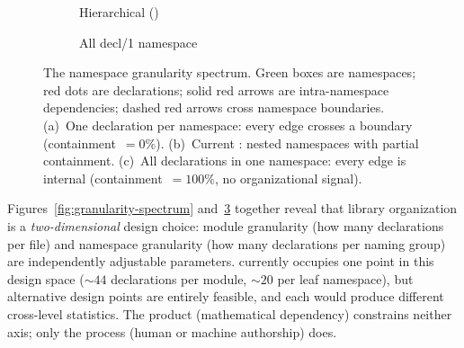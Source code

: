 \begin{figure}[ht]
\begin{subfigure}[b]{0.36\textwidth}
\caption{Hierarchical ()}
\label{fig:ns-gran-current}
\end{subfigure}%
\hfill
\begin{subfigure}[b]{0.30\textwidth}
\centering
{}
\caption{All decl/1 namespace}
\label{fig:ns-gran-single}
\end{subfigure}
\caption{The namespace granularity spectrum. \textcolor{green!50!black}{Green boxes} are namespaces; \textcolor{red!70!black}{red dots} are declarations; \textcolor{red!70!black}{solid red arrows} are intra-namespace dependencies; \textcolor{red!70!black}{dashed red arrows} cross namespace boundaries. (a)~One declaration per namespace: every edge crosses a boundary (containment~$= 0\%$). (b)~Current : nested namespaces with partial containment. (c)~All declarations in one namespace: every edge is internal (containment~$= 100\%$, no organizational signal).}
\label{fig:ns-granularity-spectrum}
\end{figure}

Figures~\ref{fig:granularity-spectrum} and~\ref{fig:ns-granularity-spectrum} together reveal that library organization is a \emph{two-dimensional} design choice: module granularity (how many declarations per file) and namespace granularity (how many declarations per naming group) are independently adjustable parameters.  currently occupies one point in this design space (${\sim}44$ declarations per module, ${\sim}20$ per leaf namespace), but alternative design points are entirely feasible, and each would produce different cross-level statistics. The product (mathematical dependency) constrains neither axis; only the process (human or machine authorship) does.
\label{sec:structural-overview}
\label{sec:cross-level-summary}
